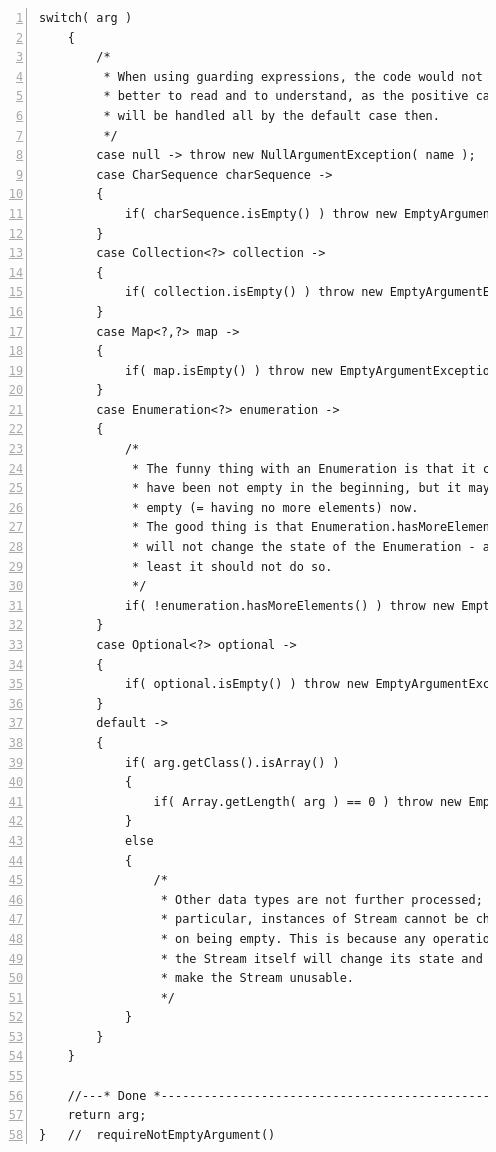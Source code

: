 \documentclass[11pt,a4paper, titlepage, parskip=half, headsepline, footsepline, cleardoublepage=current, headheight=1cm]{scrbook}
\begin{document}
\begin{lstlisting}[numbers=left,caption={requireNotEmptyArgument()}]
    switch( arg )
    {
        /*
         * When using guarding expressions, the code would not get
         * better to read and to understand, as the positive cases
         * will be handled all by the default case then.
         */
        case null -> throw new NullArgumentException( name );
        case CharSequence charSequence ->
        {
            if( charSequence.isEmpty() ) throw new EmptyArgumentException( name );
        }
        case Collection<?> collection ->
        {
            if( collection.isEmpty() ) throw new EmptyArgumentException( name );
        }
        case Map<?,?> map ->
        {
            if( map.isEmpty() ) throw new EmptyArgumentException( name );
        }
        case Enumeration<?> enumeration ->
        {
            /*
             * The funny thing with an Enumeration is that it could 
             * have been not empty in the beginning, but it may be 
             * empty (= having no more elements) now.
             * The good thing is that Enumeration.hasMoreElements() 
             * will not change the state of the Enumeration - at 
             * least it should not do so.
             */
            if( !enumeration.hasMoreElements() ) throw new EmptyArgumentException( name );
        }
        case Optional<?> optional ->
        {
            if( optional.isEmpty() ) throw new EmptyArgumentException( name );
        }
        default ->
        {
            if( arg.getClass().isArray() )
            {
                if( Array.getLength( arg ) == 0 ) throw new EmptyArgumentException( name );
            }
            else
            {
                /*
                 * Other data types are not further processed; in
                 * particular, instances of Stream cannot be checked 
                 * on being empty. This is because any operation on 
                 * the Stream itself will change its state and may 
                 * make the Stream unusable.
                 */
            }
        }
    }

    //---* Done *----------------------------------------------------------
    return arg;
}   //  requireNotEmptyArgument()
\end{lstlisting}
\end{document}
